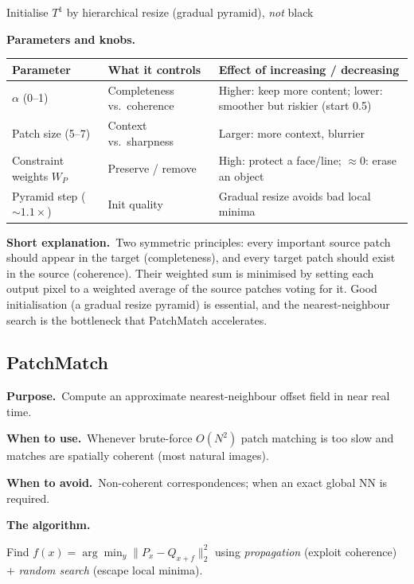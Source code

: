\documentclass[10pt]{article}
\makeatletter
\newcommand{\Purpose}{\par\smallskip\textbf{Purpose.}\ }
\newcommand{\WhenUse}{\par\textbf{When to use.}\ }
\newcommand{\WhenAvoid}{\par\textbf{When to avoid.}\ }
\newcommand{\TheAlgo}{\par\smallskip\textbf{The algorithm.}\par\nopagebreak}
\newcommand{\Knobs}{\par\smallskip\textbf{Parameters and knobs.}\par\nopagebreak}
\newcommand{\ShortExp}{\par\smallskip\textbf{Short explanation.}\ }
\newenvironment{ptable}{\begin{center}\small\begin{tabular}{@{}p{2.5cm} p{5.9cm} p{6.2cm}@{}}\toprule
Parameter & What it controls & Effect of increasing / decreasing \\ \midrule}
{\bottomrule\end{tabular}\end{center}}
\makeatother
\begin{document}
\begin{algorithm}[H]
\SetAlgoLined
{}
Initialise $T^1$ by hierarchical resize (gradual pyramid), \emph{not} black\;
\caption{Re-targeting by bidirectional similarity}
\end{algorithm}

\Knobs
\begin{ptable}
$\alpha$ (0--1) & Completeness vs.\ coherence & Higher: keep more content; lower: smoother but riskier (start 0.5) \\
Patch size (5--7) & Context vs.\ sharpness & Larger: more context, blurrier \\
Constraint weights $W_P$ & Preserve / remove & High: protect a face/line; $\approx0$: erase an object \\
Pyramid step ($\sim1.1\times$) & Init quality & Gradual resize avoids bad local minima \\
\end{ptable}
\ShortExp Two symmetric principles: every important source patch should appear in the target
(completeness), and every target patch should exist in the source (coherence). Their weighted sum is
minimised by setting each output pixel to a weighted average of the source patches voting for it. Good
initialisation (a gradual resize pyramid) is essential, and the nearest-neighbour search is the bottleneck
that PatchMatch accelerates.

\subsection{PatchMatch}\label{sub:patchmatch}
\Purpose Compute an approximate nearest-neighbour offset field in near real time.
\WhenUse Whenever brute-force $O(N^2)$ patch matching is too slow and matches are spatially coherent (most
natural images).
\WhenAvoid Non-coherent correspondences; when an exact global NN is required.
\TheAlgo Find $f(x)=\arg\min_y\|P_x-Q_{x+f}\|_2^2$ using \emph{propagation} (exploit coherence) $+$
\emph{random search} (escape local minima).
\end{document}
